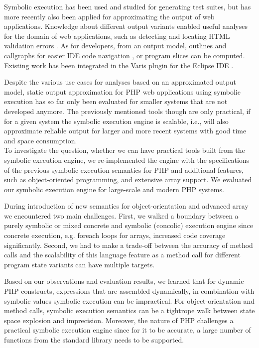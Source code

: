 \documentclass[preprint]{sig-alternate-05-2015}
\begin{document}
Symbolic execution has been used and studied for generating test suites, but
has more recently also been applied for approximating the output of web
applications. Knowledge about different output variants enabled useful analyses
for the domain of web applications, such as detecting and locating HTML
validation errors \cite{Nguyen:2011:AFH:2190078.2190142}. As for developers,
from an output model, outlines and callgraphs for easier IDE code navigation
\cite{Nguyen:2014:BCG:2635868.2635928}, or program slices
\cite{Nguyen:2015:CPS:2786805.2786872} can be computed. Existing work has been
integrated in the Varis plugin for the Eclipse IDE \cite{Nguyen:2015:VIS:2819009.2819140}.

Despite the various use cases for analyses based on an approximated output
model, static output approximation for PHP web applications using symbolic
execution has so far only been evaluated for smaller systems that are not
developed anymore. The previously mentioned tools though are only practical, if
for a given system the symbolic execution engine is scalable, i.e., will also
approximate reliable output for larger and more recent systems with good time
and space consumption.\\

To investigate the question, whether we can have practical tools built from the
symbolic execution engine, we re-implemented the engine with the specifications
of the previous symbolic execution semantics
\cite{Nguyen:2014:BCG:2635868.2635928} for PHP and additional features, such as
object-oriented programming, and extensive array support. We evaluated our
symbolic execution engine for large-scale and modern PHP systems.

During introduction of new semantics for object-orientation and advanced array
we encountered two main challenges. First, we walked a boundary between a
purely symbolic or mixed concrete and symbolic (concolic) execution engine
since concrete execution, e.g. foreach loops for arrays, increased code
coverage significantly. Second, we had to make a trade-off between the accuracy
of method calls and the scalability of this language feature as a method call
for different program state variants can have multiple targets.

Based on our observations and evaluation results, we learned that for dynamic
PHP constructs, expressions that are assembled dynamically, in combination with
symbolic values symbolic execution can be impractical. For object-orientation
and method calls, symbolic execution semantics can be a tightrope walk between
state space explosion and imprecision. Moreover, the nature of PHP challenges a
practical symbolic execution engine since for it to be accurate, a large number
of functions from the standard library needs to be supported.\\
\end{document}
